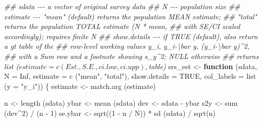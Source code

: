 \documentclass[
  letterpaper,
  DIV=11,
  numbers=noendperiod]{scrreprt}
\newenvironment{Shaded}{\begin{snugshade}}{\end{snugshade}}
\newcommand{\AttributeTok}[1]{\textcolor[rgb]{0.40,0.45,0.13}{#1}}
\newcommand{\ConstantTok}[1]{\textcolor[rgb]{0.56,0.35,0.01}{#1}}
\newcommand{\ControlFlowTok}[1]{\textcolor[rgb]{0.00,0.23,0.31}{\textbf{#1}}}
\newcommand{\DecValTok}[1]{\textcolor[rgb]{0.68,0.00,0.00}{#1}}
\newcommand{\DocumentationTok}[1]{\textcolor[rgb]{0.37,0.37,0.37}{\textit{#1}}}
\newcommand{\FunctionTok}[1]{\textcolor[rgb]{0.28,0.35,0.67}{#1}}
\newcommand{\NormalTok}[1]{\textcolor[rgb]{0.00,0.23,0.31}{#1}}
\newcommand{\OtherTok}[1]{\textcolor[rgb]{0.00,0.23,0.31}{#1}}
\newcommand{\SpecialCharTok}[1]{\textcolor[rgb]{0.37,0.37,0.37}{#1}}
\newcommand{\StringTok}[1]{\textcolor[rgb]{0.13,0.47,0.30}{#1}}
\renewcommand{\[}{\begin{equation}}
\renewcommand{\]}{\end{equation}}
\begin{document}
\begin{Shaded}
\begin{Highlighting}[]
\DocumentationTok{\#\# sdata {-}{-}{-} a vector of original survey data}
\DocumentationTok{\#\# N {-}{-}{-} population size}
\DocumentationTok{\#\# estimate {-}{-}{-} "mean" (default) returns the population MEAN estimate;}
\DocumentationTok{\#\#              "total" returns the population TOTAL estimate (N * mean,}
\DocumentationTok{\#\#              with SE/CI scaled accordingly); requires finite N}
\DocumentationTok{\#\# show.details {-}{-}{-} if TRUE (default), also return a gt table of the}
\DocumentationTok{\#\#                  row{-}level working values y\_i, y\_i{-}\textbackslash{}bar y, (y\_i{-}\textbackslash{}bar y)\^{}2,}
\DocumentationTok{\#\#                  with a Sum row and a footnote showing s\_y\^{}2; NULL otherwise}
\DocumentationTok{\#\# returns list ($estimate = c(Est., S.E., ci.low, ci.upp), $table)}
\NormalTok{srs\_est }\OtherTok{\textless{}{-}} \ControlFlowTok{function}\NormalTok{ (sdata, }\AttributeTok{N =} \ConstantTok{Inf}\NormalTok{, }\AttributeTok{estimate =} \FunctionTok{c}\NormalTok{ (}\StringTok{"mean"}\NormalTok{, }\StringTok{"total"}\NormalTok{),}
                      \AttributeTok{show.details =} \ConstantTok{TRUE}\NormalTok{, }\AttributeTok{col\_labels =} \FunctionTok{list}\NormalTok{ (}\AttributeTok{y =} \StringTok{"y\_i"}\NormalTok{))}
\NormalTok{\{}
\NormalTok{    estimate }\OtherTok{\textless{}{-}} \FunctionTok{match.arg}\NormalTok{ (estimate)}

\NormalTok{    n }\OtherTok{\textless{}{-}} \FunctionTok{length}\NormalTok{ (sdata)}
\NormalTok{    ybar }\OtherTok{\textless{}{-}} \FunctionTok{mean}\NormalTok{ (sdata)}
\NormalTok{    dev }\OtherTok{\textless{}{-}}\NormalTok{ sdata }\SpecialCharTok{{-}}\NormalTok{ ybar}
\NormalTok{    s2y }\OtherTok{\textless{}{-}} \FunctionTok{sum}\NormalTok{ (dev}\SpecialCharTok{\^{}}\DecValTok{2}\NormalTok{) }\SpecialCharTok{/}\NormalTok{ (n }\SpecialCharTok{{-}} \DecValTok{1}\NormalTok{)}
\NormalTok{    se.ybar }\OtherTok{\textless{}{-}} \FunctionTok{sqrt}\NormalTok{((}\DecValTok{1} \SpecialCharTok{{-}}\NormalTok{ n }\SpecialCharTok{/}\NormalTok{ N)) }\SpecialCharTok{*} \FunctionTok{sd}\NormalTok{ (sdata) }\SpecialCharTok{/} \FunctionTok{sqrt}\NormalTok{(n)}


\end{Highlighting}
\end{Shaded}
\end{document}
